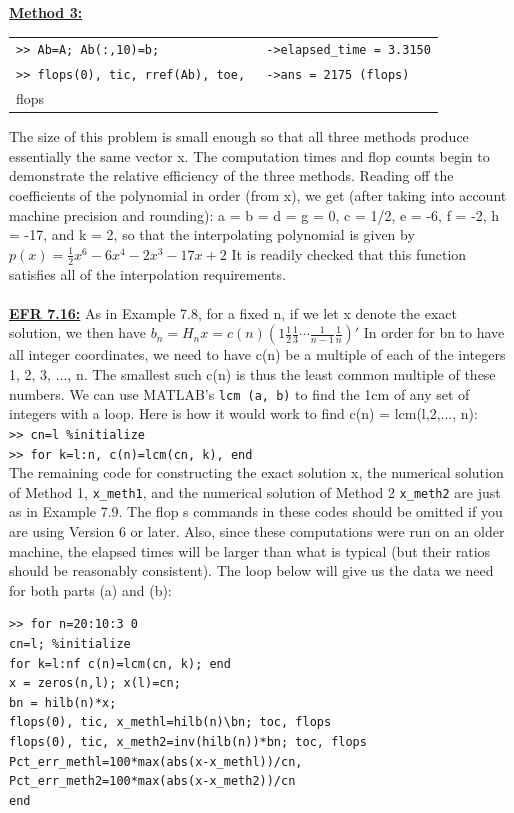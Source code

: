 \documentclass[../main.tex]{subfiles}
\begin{document}
\textbf{\underline{Method 3:}}
\begin{center}
\begin{tabular}{|l|l|}
\hline
\texttt{>> Ab=A; Ab(:,10)=b; 
}&\texttt{->elapsed\_time = 3.3150}\\
\texttt{>> flops(0), tic, rref(Ab), toe, 
 }&\texttt{->ans = 2175 (flops) }\\
 flops&\\
\hline
\end{tabular}
\end{center}
The size of this problem is small enough so that all three methods produce essentially the same vector 
x. The computation times and flop counts begin to demonstrate the relative efficiency of the three 
methods. Reading off the coefficients of the polynomial in order (from x), we get (after taking into 
account machine precision and rounding): a = b = d = g = 0, c = 1/2, e = -6, f = -2, h = -17, and k = 2, so that the interpolating polynomial is given by $p(x) =\frac{1}{2}x^6-6x^4-2x^3-17x+2$ It is readily checked that this function satisfies all of the interpolation requirements. 
\\
\\
\textbf{\underline{EFR 7.16:}} As in Example 7.8, for a fixed n, if we let x denote the exact solution, we then have $b_n = H_nx=c(n)(1\frac{1}{2}\frac{1}{3}\cdots\frac{1}{n-1}\frac{1}{n})'$ In order for bn to have all integer coordinates, we need to have c(n) be a multiple of each of the integers 1, 2, 3, ..., n. The smallest such c(n) is thus the least 
common multiple of these numbers. We can use MATLAB's \texttt{lcm (a, b)} to find the 1cm of any set of 
integers with a loop. Here is how it would work to find c(n) = lcm(l,2,..., n): \\
\texttt{>> cn=l \%initialize }\\
\texttt{>> for k=l:n, c(n)=lcm(cn, k), end}\\
The remaining code for constructing the exact solution x, the numerical solution of Method 1, 
\texttt{x\_meth1}, and the numerical solution of Method 2 \texttt{x\_meth2} are just as in Example 7.9. The flop s 
commands in these codes should be omitted if you are using Version 6 or later. Also, since these 
computations were run on an older machine, the elapsed times will be larger than what is typical (but their ratios should be reasonably consistent). The loop below will give us the data we need for both 
parts (a) and (b):
\begin{lstlisting}
>> for n=20:10:3 0 
cn=l; %initialize 
for k=l:nf c(n)=lcm(cn, k); end 
x = zeros(n,l); x(l)=cn; 
bn = hilb(n)*x; 
flops(0), tic, x_methl=hilb(n)\bn; toc, flops 
flops(0), tic, x_meth2=inv(hilb(n))*bn; toc, flops 
Pct_err_methl=100*max(abs(x-x_methl))/cn, 
Pct_err_meth2=100*max(abs(x-x_meth2))/cn 
end
\end{lstlisting}
\end{document}
